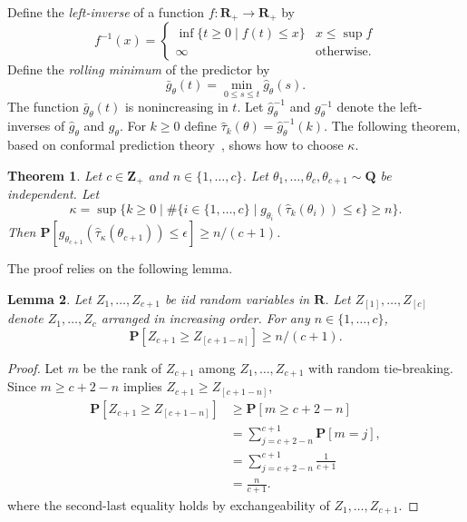\documentclass[12pt]{article}
\renewcommand{\cite}[1]{\citep{#1}}
\newtheorem{theorem}{Theorem}[section]     %
\newtheorem{lemma}[theorem]{Lemma}         %
\theoremstyle{definition}
\theoremstyle{remark}
\newcommand{\paramdist}{\mathbf{Q}}
\newcommand{\param}{\theta}
\newcommand{\reals}{\mathbf{R}}
\newcommand{\Z}{\mathbf{Z}}
\newcommand{\Prob}{\mathbf{P}}
\newcommand{\truegap}{g}
\newcommand{\predgap}{\hat{g}}
\newcommand{\tol}{\epsilon}
\newcommand{\pst}{\hat{\tau}}
\newcommand{\lt}{\kappa}
\newcommand{\ncalib}{c}
\newcommand{\rollmin}{\bar{g}}
\newcommand{\change}[1]{#1}
\newcommand{\paramdist}{\mathbf{Q}}
\newcommand{\param}{\theta}
\newcommand{\reals}{\mathbf{R}}
\newcommand{\Z}{\mathbf{Z}}
\newcommand{\Prob}{\mathbf{P}}
\newcommand{\truegap}{g}
\newcommand{\predgap}{\hat{g}}
\newcommand{\tol}{\epsilon}
\newcommand{\pst}{\hat{\tau}}
\newcommand{\lt}{\kappa}
\newcommand{\ncalib}{c}
\newcommand{\rollmin}{\bar{g}}
\newcommand{\change}[1]{#1}
\theoremstyle{plain}
\newtheorem{theorem}{Theorem}[section]
\newtheorem{lemma}[theorem]{Lemma}
\theoremstyle{definition}
\theoremstyle{remark}
\begin{document}
Define the \emph{left-inverse} of a function $f:\reals_+ \rightarrow \reals_+$ by
\begin{equation*}
    f^{-1}(x) = \begin{cases}
        \inf\{t \ge 0 \mid f(t) \le x\} & x \le \sup f \\
        \infty & \text{otherwise}.
    \end{cases}
\end{equation*}
Define the \emph{rolling minimum} of the predictor by
\begin{equation*}
    \rollmin_\param(t) = \min_{0 \le s \le t} \predgap_\param(s).
\end{equation*}
The function $\rollmin_\param(t)$ is nonincreasing in $t$.
Let $\predgap_\param^{-1}$ and $\truegap_\param^{-1}$ denote the left-inverses of $\predgap_\param$ and $\truegap_\param$.
For $k \ge 0$ define $\pst_k(\param) = \predgap^{-1}_\param(k)$.
The following theorem, based on conformal prediction theory~\cite{Angelopoulos2021AGI}, shows how to choose $\lt$.
\begin{theorem} \label{thm:conformal}
    Let $\ncalib \in \Z_+$ and $n \in \{1, \dots, \ncalib\}$.
    Let $\param_1, \dots, \param_\ncalib, \param_{\ncalib+1} \sim \paramdist$ be independent.
    Let
    \begin{equation*}
        \lt = \sup \{ k \ge 0 \mid \#\{i \in \{1, \dots, \ncalib\} \mid \truegap_{\param_i}(\pst_k(\param_i)) \le \tol\} \ge n\}.
    \end{equation*}
    Then $\Prob[\truegap_{\param_{\ncalib+1}}(\pst_{\lt}(\param_{\ncalib+1})) \le \tol] \ge \change{n}/(\ncalib + 1)$.
\end{theorem}
The proof relies on the following lemma.
\begin{lemma} \label{lemma:ordering}
    Let $Z_1, \dots, Z_{\ncalib + 1}$ be iid random variables in $\reals$.
    Let $Z_{[1]}, \dots, Z_{[\ncalib]}$ denote $Z_1, \dots, Z_\ncalib$ arranged in increasing order.
    For any $n \in \{1, \dots, \ncalib\}$,
    $$
    \Prob[Z_{\ncalib + 1} \ge Z_{[\ncalib + 1 - n]}] \ge n / (\ncalib + 1).
    $$
\end{lemma}
\begin{proof}
    Let $m$ be the rank of $Z_{\ncalib+1}$ among $Z_1, \dots, Z_{\ncalib + 1}$ with random tie-breaking.
    Since $m \ge \ncalib + 2 - n$ implies $Z_{\ncalib + 1} \ge Z_{[\ncalib + 1 - n]}$,
    \begin{align*}
        \Prob[Z_{\ncalib + 1} \ge Z_{[\ncalib + 1 - n]}] &\ge \Prob[m \ge \ncalib + 2 - n] \\
        & = \sum_{j=\ncalib + 2 - n}^{\ncalib + 1} \Prob[m = j], \\
        &= \sum_{j=\ncalib + 2 - n}^{\ncalib + 1} \frac{1}{\ncalib + 1} \\
        &= \frac{n}{\ncalib + 1}.
    \end{align*}
    where the second-last equality holds by exchangeability of $Z_1, \dots, Z_{\ncalib+1}$.
\end{proof}
\end{document}
